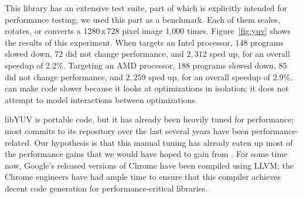 This library has an extensive test suite, part of which is explicitly
intended for performance testing; we used this part as a benchmark.
%
Each of them scales, rotates, or converts a 1280\,x\,728 pixel
image 1,000 times.
%
Figure~\ref{fig:yuv} shows the results of this experiment.
%
When \minotaur{} targets an Intel processor, $148$ programs slowed down, $72$
did not change performance, and $2,312$ sped up, for an overall speedup of
2.2\%.
%
Targeting an AMD processor, $188$ programs slowed down, $85$ did not
change performance, and $2,259$ sped up, for an overall speedup of 2.9\%.
%
\minotaur{} can make code slower because it looks at optimizations in
isolation; it does not attempt to model interactions between
optimizations.


libYUV is portable code, but it has already been heavily tuned for
performance; most commits to its repository over the last several
years have been performance-related.
%
Our hypothesis is that this manual tuning has already eaten up most of
the performance gains that we would have hoped to gain from \minotaur{}.
%
For some time now, Google's released versions of Chrome have been
compiled using LLVM; the Chrome engineers have had ample time to
ensure that this compiler achieves decent code generation for
performance-critical libraries.



